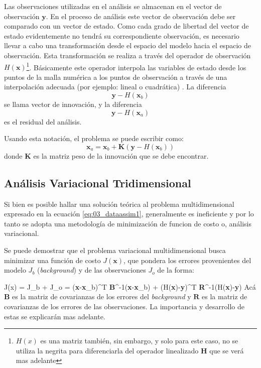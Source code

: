 Las observaciones utilizadas en el análisis se almacenan en el vector de observación $\mathbf{y}$. En el proceso de análisis este vector de observación debe ser comparado con un vector de estado. Como cada grado de libertad del vector de estado evidentemente no tendrá su correspondiente observación, es necesario llevar a cabo una transformación desde el espacio del modelo hacia el espacio de observación. Esta transformación se realiza a través del operador de observación $H(\mathbf{x})$\footnote{$H(x)$ es una matriz también, sin embargo, y solo para este caso, no se utiliza la negrita para diferenciarla del operador linealizado $\textbf{H}$ que se verá mas adelante}. Básicamente este operador interpola las variables de estado desde los puntos de la malla numérica a los puntos de observación a través de una interpolación adecuada (por ejemplo: lineal o cuadrática) . La diferencia
\begin{equation*}
	\mathbf{y}-H(\mathbf{x}_b)
\end{equation*}
se llama vector de innovación, y la diferencia
\begin{equation*}
\mathbf{y}-H(\mathbf{x}_a)
\end{equation*}
es el residual del análisis.

Usando esta notación, el problema se puede escribir como:
\begin{equation}\label{eq:03_dataassim1}
	\mathbf{x}_a = \mathbf{x}_b + \mathbf{K}(\mathbf{y} - H(\mathbf{x}_b))
\end{equation}
donde $\mathbf{K}$ es la matriz peso de la innovación que se debe encontrar.
\subsection{Análisis Variacional Tridimensional}

Si bien es posible hallar una solución teórica al problema multidimensional expresado en la ecuación \ref{eq:03_dataassim1}, generalmente es ineficiente y por lo tanto se adopta una metodología de minimización de funcion de costo o, análisis variacional.

Se puede demostrar \citep{warner2010numerical} que el problema variacional multidimensional busca minimizar una función de costo $J(\mathbf{x})$, que pondera los errores provenientes del modelo $J_b$ (\emph{background}) y de las observaciones $J_o$ de la forma:

\be 
J(x) = J_b + J_o = (\textbf{x}-\textbf{x}_b)^T \textbf{B}^{-1}(\textbf{x}-\textbf{x}_b) + (H(\textbf{x})-\textbf{y})^T \textbf{R}^{-1}(H(\textbf{x})-\textbf{y})
\ee 
Acá $\textbf{B}$ es la matriz de covarianzas de los errores del \emph{background} y $\textbf{R}$ es la matriz de covarianzas de los errores de las observaciones. La importancia y desarrollo de estas se explicarán mas adelante.

